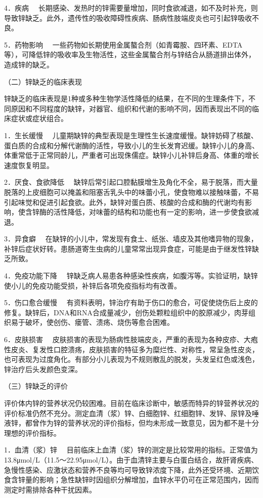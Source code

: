 {4．疾病}
　长期感染、发热时的锌需要量增加，同时食欲减退，如不及时补充，则导致锌缺乏。此外，遗传性的吸收障碍性疾病、肠病性肢端皮炎也可引起锌吸收不良。

{5．药物影响}
　一些药物如长期使用金属螯合剂（如青霉胺、四环素、EDTA等），可降低锌的吸收率及生物活性，这些金属螯合剂与锌结合从肠道排出体外，造成锌的缺乏。

（二）锌缺乏的临床表现

锌缺乏的临床表现是1种或多种生物学活性降低的结果，在不同的生理条件下，不同原因和不同程度的缺锌，对器官、组织和代谢的影响不同，因而表现出不同的临床症状或症状组合。

{1．生长缓慢}
　儿童期缺锌的典型表现是生理性生长速度缓慢。缺锌妨碍了核酸、蛋白质的合成和分解代谢酶的活性，导致小儿的生长发育迟缓。缺锌小儿的身高、体重常低于正常同龄儿，严重者可出现侏儒症。缺锌小儿补锌后身高、体重的增长速度恢复明显。

{2．厌食、食欲降低}
　缺锌后常引起口腔黏膜增生及角化不全，易于脱落，而大量脱落的上皮细胞可以掩盖和阻塞舌乳头中的味蕾小孔，使食物难以接触味蕾，不易引起味觉和促进引起食欲。此外，缺锌对蛋白质、核酸的合成和酶的代谢均有影响，使含锌酶的活性降低，对味蕾的结构和功能也有一定的影响，进一步使食欲减退。

{3．异食癖}
　在缺锌的小儿中，常发现有食土、纸张、墙皮及其他嗜异物的现象，补锌后症状好转。患肠道寄生虫病的儿童常常出现异食症，可能是由于继发性锌缺乏所致。

{4．免疫功能下降}
　锌缺乏病人易患各种感染性疾病，如腹泻等。实验证明，缺锌使小儿的免疫功能受损，补锌后各项免疫指标均有改善。

{5．伤口愈合缓慢}
　有资料表明，锌治疗有助于伤口的愈合，可促使烧伤后上皮的修复。缺锌后，DNA和RNA合成量减少，创伤处颗粒组织中的胶原减少，肉芽组织易于破坏，使创伤、瘘管、溃疡、烧伤等愈合困难。

{6．皮肤损害}
　皮肤损害的表现为肠病性肢端皮炎，严重的表现为各种皮疹、大疱性皮炎、复发性口腔溃疡，皮肤损害的特征多为糜烂性、对称性，常呈急性皮炎，也可表现为过度角化。有部分小儿表现为不规则散乱的脱发，头发呈红色或浅色，锌治疗后头发颜色变深。

（三）锌缺乏的评价

评价体内锌的营养状况仍较困难。目前在临床诊断中，敏感而特异的锌营养状况的评价标准仍然不充分。测定血清（浆）锌、白细胞锌、红细胞锌、发锌、尿锌及唾液锌，都曾作为锌的营养状况的评价指标，但均未形成一致意见，因为都不是十分理想的评价指标。

{1．血清（浆）锌}
　目前临床上血清（浆）锌的测定是比较常用的指标。正常值为13.8μmol/L（11.5～22.95μmol/L）。由于血清锌主要与白蛋白结合，故肝肾疾病、急慢性感染、应激状态和营养不良等均可导致锌浓度下降，此外还受环境、近期饮食含锌量的影响；急性缺锌时因组织分解增加，血锌水平仍可在正常范围内，因而测定时需排除各种干扰因素。

